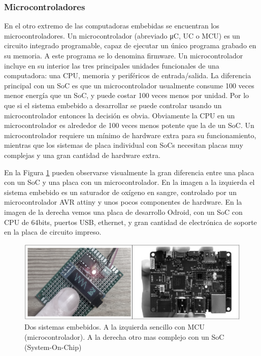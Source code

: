 \documentclass[output=paper, 
colorlinks,
citecolor=brown,
newtxmath
]{langscibook}
\begin{document}
\subsubsection{Microcontroladores}
En el otro extremo de las computadoras embebidas se encuentran los
microcontroladores. Un microcontrolador (abreviado μC, UC o MCU) 
es un circuito integrado programable, capaz de ejecutar un único programa
grabado en su memoria. A este programa se lo denomina firmware.
Un microcontrolador incluye en su interior las tres principales 
unidades funcionales de una computadora: una CPU, 
memoria y periféricos de entrada/salida.
La diferencia principal con un SoC es que un microcontrolador usualmente
consume 100 veces menor energía que un SoC, y puede costar 100 veces
menos por unidad. Por lo que si el sistema embebido
a desarrollar se puede controlar usando un microcontrolador 
entonces la decisión es obvia. Obviamente la CPU en un microcontrolador
es alrededor de 100 veces menos potente que la de un SoC.
Un microcontrolador 
requiere un mínimo de hardware extra para su funcionamiento, 
mientras que los sistemas de placa individual con SoCs
necesitan placas muy complejas y una gran cantidad de hardware extra.

En la Figura \ref{fig:microvssoc} pueden observarse visualmente
la gran diferencia entre una placa con un SoC y una placa
con un microcontrolador. En la imagen a la izquierda el sistema
embebido es un saturador de oxígeno en sangre, controlado
por un microcontrolador AVR attiny y unos pocos componentes de hardware.
En la imagen de la derecha vemos
una placa de desarrollo Odroid, con un SoC con CPU de 64bits,
puertos USB, ethernet, y gran cantidad de electrónica de soporte
en la placa de circuito impreso.

\begin{figure}
\includegraphics[scale=0.25]{images/microvssoc.png}
\caption{Dos sistemas embebidos. A la izquierda sencillo con MCU (microcontrolador). A la derecha otro mas complejo con un SoC (System-On-Chip)}
\label{fig:microvssoc}
\end{figure}
\end{document}
